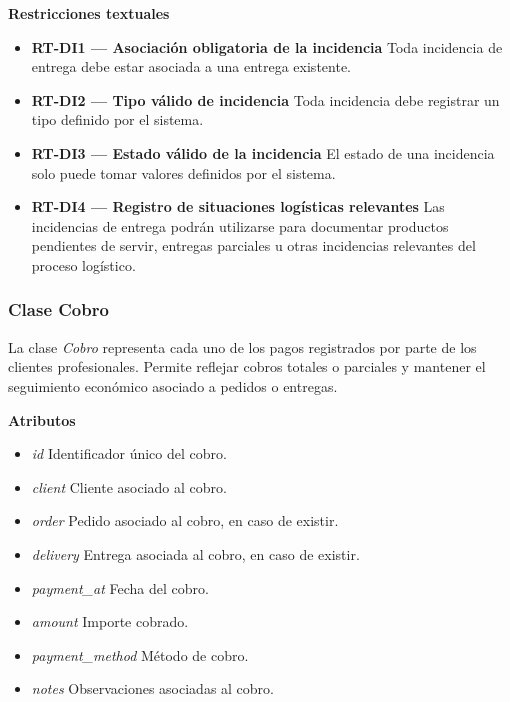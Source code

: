 \textbf{Restricciones textuales}

\begin{itemize}
      \item \textbf{RT-DI1 — Asociación obligatoria de la incidencia}
            Toda incidencia de entrega debe estar asociada a una entrega existente.
      \item \textbf{RT-DI2 — Tipo válido de incidencia}
            Toda incidencia debe registrar un tipo definido por el sistema.
      \item \textbf{RT-DI3 — Estado válido de la incidencia}
            El estado de una incidencia solo puede tomar valores definidos por el sistema.
      \item \textbf{RT-DI4 — Registro de situaciones logísticas relevantes}
            Las incidencias de entrega podrán utilizarse para documentar productos pendientes de servir, entregas parciales u otras incidencias relevantes del proceso logístico.
\end{itemize}

\subsubsection{Clase Cobro}

La clase \textit{Cobro} representa cada uno de los pagos registrados por parte de los clientes profesionales. Permite reflejar cobros totales o parciales y mantener el seguimiento económico asociado a pedidos o entregas.

\textbf{Atributos}

\begin{itemize}
      \item \textit{id}
            Identificador único del cobro.
      \item \textit{client}
            Cliente asociado al cobro.
      \item \textit{order}
            Pedido asociado al cobro, en caso de existir.
      \item \textit{delivery}
            Entrega asociada al cobro, en caso de existir.
      \item \textit{payment\_at}
            Fecha del cobro.
      \item \textit{amount}
            Importe cobrado.
      \item \textit{payment\_method}
            Método de cobro.
      \item \textit{notes}
            Observaciones asociadas al cobro.
\end{itemize}

